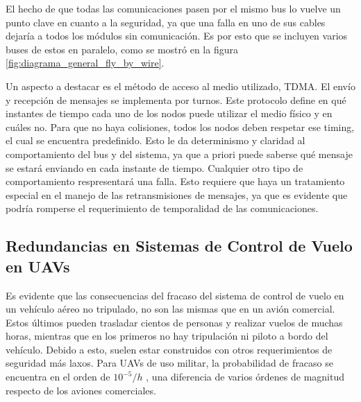 El hecho de que todas las comunicaciones pasen por el mismo bus lo vuelve un punto clave en cuanto a la seguridad, ya que una falla en uno de sus cables dejaría a todos los módulos sin comunicación. Es por esto que se incluyen varios buses de estos en paralelo, como se mostró en la figura \ref{fig:diagrama_general_fly_by_wire}.

Un aspecto a destacar es el método de acceso al medio utilizado, TDMA. El envío y recepción de mensajes se implementa por turnos. Este protocolo define en qué instantes de tiempo cada uno de los nodos puede utilizar el medio físico y en cuáles no. Para que no haya colisiones, todos los nodos deben respetar ese timing, el cual se encuentra predefinido. Esto le da determinismo y claridad al comportamiento del bus y del sistema, ya que a priori puede saberse qué mensaje se estará enviando en cada instante de tiempo. Cualquier otro tipo de comportamiento respresentará una falla. Esto requiere que haya un tratamiento especial en el manejo de las retransmisiones de mensajes, ya que es evidente que podría romperse el requerimiento de temporalidad de las comunicaciones.







\subsection{Redundancias en Sistemas de Control de Vuelo en UAVs}

Es evidente que las consecuencias del fracaso del sistema de control de vuelo en un vehículo aéreo no tripulado, no son las mismas que en un avión comercial. Estos últimos pueden trasladar cientos de personas y realizar vuelos de muchas horas, mientras que en los primeros no hay tripulación ni piloto a bordo del vehículo. Debido a esto, suelen estar construidos con otros requerimientos de seguridad más laxos. Para UAVs de uso militar, la probabilidad de fracaso se encuentra en el orden de $10^{-5} / h$ \cite{zhang2020architecture}\cite[p.~491]{collinson2023introduction}, una diferencia de varios órdenes de magnitud respecto de los aviones comerciales.

